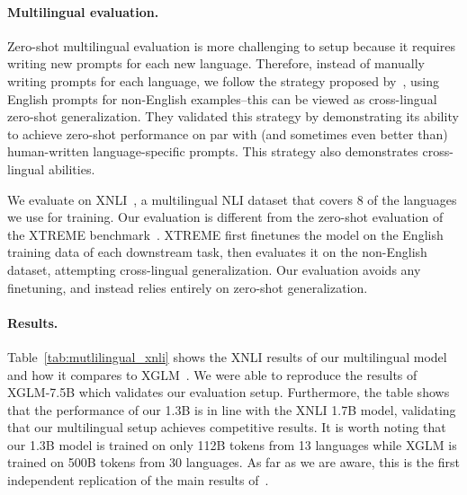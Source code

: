 \paragraph{Multilingual evaluation.}
Zero-shot multilingual evaluation is more challenging to setup because it requires writing new prompts for each new language. Therefore, instead of manually writing prompts for each language, we follow the strategy proposed by~\citet{XGLM}, using English prompts for non-English examples--this can be viewed as cross-lingual zero-shot generalization. They validated this strategy by demonstrating its ability to achieve zero-shot performance on par with (and sometimes even better than) human-written language-specific prompts. This strategy also demonstrates cross-lingual abilities.



We evaluate on XNLI~\citep{conneau2018xnli}, a multilingual NLI dataset  that covers 8 of the languages we use for training. 
Our evaluation is different from the zero-shot evaluation of the XTREME benchmark~\cite{Hu2020XTREMEAM}. XTREME first finetunes the model on the English training data of each downstream task, then evaluates it on the non-English dataset, attempting cross-lingual generalization. 
Our evaluation avoids any finetuning, and instead relies entirely on zero-shot generalization.
 

\paragraph{Results.}
Table~\ref{tab:mutlilingual_xnli} shows the XNLI results of our multilingual model and how it compares to XGLM~\cite{XGLM}.
We were able to reproduce the results of XGLM-7.5B which validates our evaluation setup. Furthermore, the table shows that the performance of our 1.3B 
is in line with the XNLI 1.7B model, validating that our multilingual setup achieves competitive results. It is worth noting that our 1.3B model is trained on only 112B tokens from 13 languages while 
XGLM is trained on 500B tokens from 30 languages. As far as we are aware, this is the first independent replication of the main results of~\citet{XGLM}.

